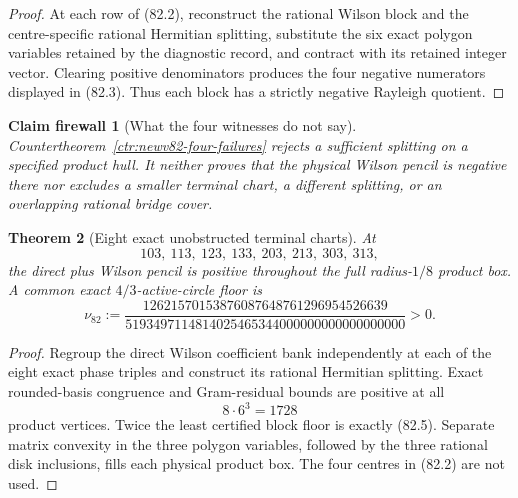 \documentclass[11pt,oneside]{article}
\newtheorem{theorem}{Theorem}[section]
\newtheorem{firewall}[theorem]{Claim firewall}
\theoremstyle{definition}
\theoremstyle{remark}
\begin{document}
\begin{proof}
At each row of (82.2), reconstruct the rational Wilson block and the
centre-specific rational Hermitian splitting, substitute the six
exact polygon variables retained by the diagnostic record, and
contract with its retained integer vector.  Clearing positive
denominators produces the four negative numerators displayed in
(82.3).  Thus each block has a strictly negative Rayleigh quotient.
\end{proof}

\begin{firewall}[What the four witnesses do not say]
\label{fire:newv82-witnesses}
Countertheorem~\ref{ctr:newv82-four-failures} rejects a sufficient
splitting on a specified product hull.  It neither proves that the
physical Wilson pencil is negative there nor excludes a smaller
terminal chart, a different splitting, or an overlapping rational
bridge cover.
\end{firewall}

\begin{theorem}[Eight exact unobstructed terminal charts]
\label{thm:newv82-eight-charts}
At
\[
 103,\ 113,\ 123,\ 133,\ 203,\ 213,\ 303,\ 313,        \tag{82.4}
\]
the direct plus Wilson pencil is positive throughout the full
radius-\(1/8\) product box.  A common exact \(4/3\)-active-circle
floor is
\[
\nu_{82}:=
\frac{12621570153876087648761296954526639}
     {5193497114814025465344000000000000000000}>0.      \tag{82.5}
\]
\end{theorem}

\begin{proof}
Regroup the direct Wilson coefficient bank independently at each of
the eight exact phase triples and construct its rational Hermitian
splitting.  Exact rounded-basis congruence and Gram-residual bounds
are positive at all
\[
 8\cdot6^3=1728                                         \tag{82.6}
\]
product vertices.  Twice the least certified block floor is exactly
(82.5).  Separate matrix convexity in the three polygon variables,
followed by the three rational disk inclusions, fills each physical
product box.  The four centres in (82.2) are not used.
\end{proof}
\end{document}
